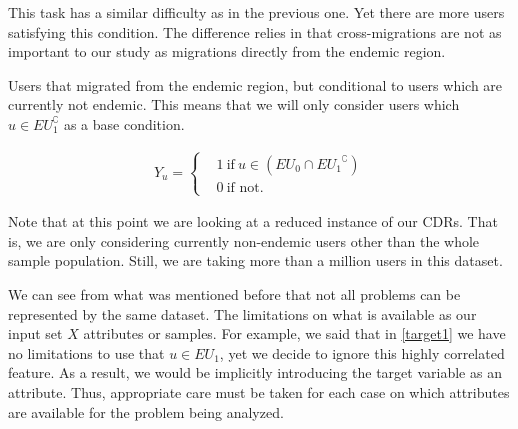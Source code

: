 This task has a similar difficulty as in the previous one. Yet there are more users satisfying this condition.
The difference relies in that cross-migrations are not as important to our study as migrations directly from the endemic region.


\begin{problem}\label{target4}
Users that migrated from the endemic region, but conditional to users which are currently not endemic. This means that we will only consider users which $u \in EU_{1}^{\complement}$ as a base condition.

\begin{align*}
			Y_u =
			\begin{cases}
				& 1 \ \mbox{if} \ u \in ( EU_{0} \cap { EU_{1} }^{\complement})    \\
				& 0 \ \mbox{if not}.
			\end{cases}
		\end{align*}
\end{problem}

Note that at this point we are looking at a reduced instance of our CDRs.
That is, we are only considering currently non-endemic users other than the whole sample population.
Still, we are taking more than a million users in this dataset.






We can see from what was mentioned before that not all problems can be represented by the same dataset.
The limitations on what is available as our input set $X$ attributes or samples.
For example, we said that in \cref{target1} we have no limitations to use that $u \in EU_{1}$, yet we decide to ignore this highly correlated feature.
As a result, we  would be implicitly introducing the target variable as an attribute.
Thus, appropriate care must be taken for each case on which attributes are available for the problem being analyzed.


